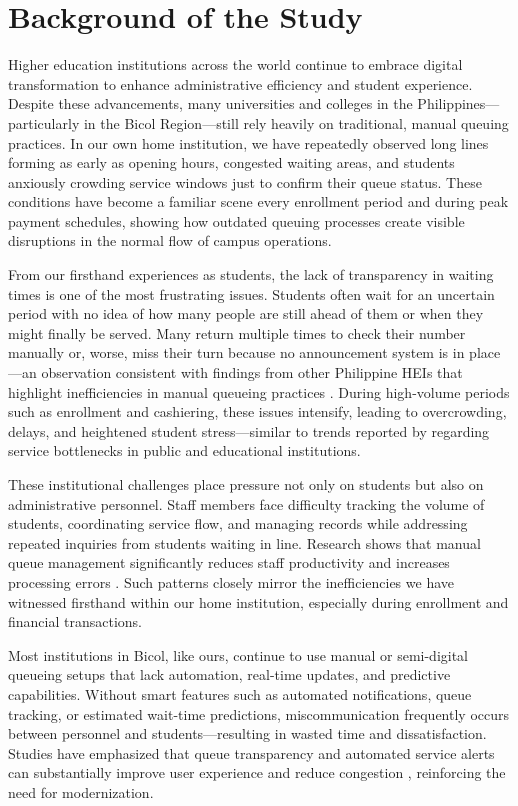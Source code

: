 \documentclass{research}
\begin{document}
\section{Background of the Study}

\indent Higher education institutions across the world continue to embrace digital transformation to enhance administrative efficiency and student experience. Despite these advancements, many universities and colleges in the Philippines—particularly in the Bicol Region—still rely heavily on traditional, manual queuing practices. In our own home institution, we have repeatedly observed long lines forming as early as opening hours, congested waiting areas, and students anxiously crowding service windows just to confirm their queue status. These conditions have become a familiar scene every enrollment period and during peak payment schedules, showing how outdated queuing processes create visible disruptions in the normal flow of campus operations.

From our firsthand experiences as students, the lack of transparency in waiting times is one of the most frustrating issues. Students often wait for an uncertain period with no idea of how many people are still ahead of them or when they might finally be served. Many return multiple times to check their number manually or, worse, miss their turn because no announcement system is in place—an observation consistent with findings from other Philippine HEIs that highlight inefficiencies in manual queueing practices \cite{ref51}. During high-volume periods such as enrollment and cashiering, these issues intensify, leading to overcrowding, delays, and heightened student stress—similar to trends reported by \cite{ref87} regarding service bottlenecks in public and educational institutions.

These institutional challenges place pressure not only on students but also on administrative personnel. Staff members face difficulty tracking the volume of students, coordinating service flow, and managing records while addressing repeated inquiries from students waiting in line. Research shows that manual queue management significantly reduces staff productivity and increases processing errors \cite{ref39}. Such patterns closely mirror the inefficiencies we have witnessed firsthand within our home institution, especially during enrollment and financial transactions.

Most institutions in Bicol, like ours, continue to use manual or semi-digital queueing setups that lack automation, real-time updates, and predictive capabilities. Without smart features such as automated notifications, queue tracking, or estimated wait-time predictions, miscommunication frequently occurs between personnel and students—resulting in wasted time and dissatisfaction. Studies have emphasized that queue transparency and automated service alerts can substantially improve user experience and reduce congestion \cite{ref88}, reinforcing the need for modernization.
\end{document}
